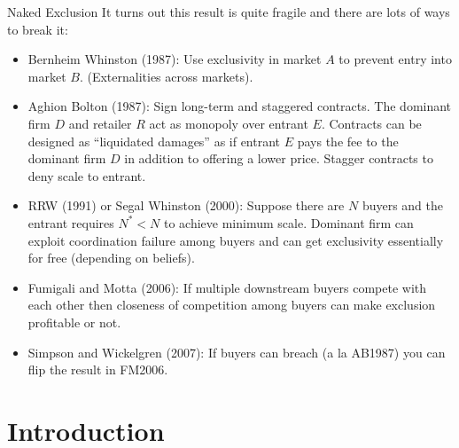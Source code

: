 \documentclass[aspectratio=169]{beamer}
\begin{document}
\begin{frame}{Naked Exclusion}
It turns out this result is quite fragile and there are lots of ways to break it:
\begin{itemize}
\item Bernheim Whinston (1987): Use exclusivity in market $A$ to prevent entry into market $B$. (Externalities across markets).
\item Aghion Bolton (1987): Sign long-term and staggered contracts. The dominant firm $D$ and retailer $R$ act as monopoly over entrant $E$. Contracts can be designed as ``liquidated damages'' as if entrant $E$ pays the fee to the dominant firm $D$ in addition to offering a lower price. Stagger contracts to deny scale to entrant.
\item RRW (1991) or Segal Whinston (2000): Suppose there are $N$ buyers and the entrant requires $N^* < N$ to achieve minimum scale. Dominant firm can exploit \alert{coordination failure} among buyers and can get exclusivity essentially for free (depending on beliefs).
\item Fumigali and Motta (2006): If multiple downstream buyers compete with each other then closeness of competition among buyers can make exclusion profitable or not.
\item Simpson and Wickelgren (2007): If buyers can breach (a la AB1987) you can flip the result in FM2006.
\end{itemize}
\end{frame}


\section{Introduction}
\end{document}
